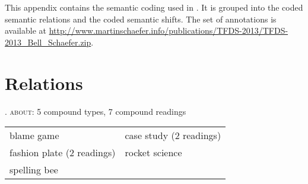 This appendix contains the semantic coding used in \citet{BellandSchaefer:2013}. It is grouped into the coded semantic relations and the coded semantic shifts. The set of annotations is available at \url{http://www.martinschaefer.info/publications/TFDS-2013/TFDS-2013_Bell_Schaefer.zip}.
\section{Relations}
\label{sec:relations_annotated}
\ex. \textsc{about}: 5 compound types, 7 compound readings\\
\begin{tabular}[h]{ll}
  blame game&case study (2 readings)\\
fashion plate (2 readings)&rocket science\\
spelling bee&
\end{tabular}

